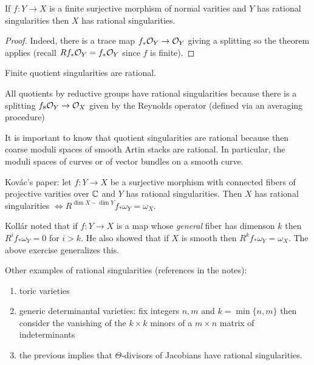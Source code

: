 \documentclass[12pt]{article}
\begin{document}
\begin{cor}
If $f : Y \to X$ is a finite surjective morphism of normal varities and $Y$ has rational singularities then $X$ has rational singularities.
\end{cor}

\begin{proof}
Indeed, there is a trace map $f_* \mathcal{O}_{Y} \to \mathcal{O}_{Y}$ giving a splitting so the theorem applies (recall $R f_* \mathcal{O}_{Y} = f_* \mathcal{O}_{Y}$ since $f$ is finite).
\end{proof}

\begin{cor}
Finite quotient singularities are rational. 
\end{cor}

\begin{example}
All quotients by reductive groups have rational singularities because there is a splitting $f_8 \mathcal{O}_{Y} \to \mathcal{O}_{X}$ given by the Reynolds operator (defined via an averaging procedure)
\end{example}

It is important to know that quotient singularities are rational because then coarse moduli spaces of smooth Artin stacks are rational. In particular, the moduli spaces of curves or of vector bundles on a smooth curve. 

\begin{exercise}
Kov\'{a}c's paper: let $f : Y \to X$ be a surjective morphism with connected fibers of projective varities over $\mathbb{C}$ and $Y$ has rational singularities. Then $X$ has rational singularities $\iff R^{\dim{X} - \dim{Y}} f_* \omega_Y = \omega_X$.
\end{exercise}

Koll\'{a}r noted that if $f : Y \to X$ is a map whose \textit{general} fiber has dimenson $k$ then $R^i f_* \omega_Y = 0$ for $i > k$. He also showed that if $X$ is smooth then $R^k f_* \omega_Y = \omega_X$. The above exercise generalizes this. 

\begin{exercise}
Other examples of rational singularities (references in the notes):
\begin{enumerate}
\item toric varieties
\item generic determinantal varieties: fix integers $n,m$ and $k = \min \{ n, m \}$ then consider the vanishing of the $k \times k$ minors of a $m \times n$ matrix of indeterminants
\item the previous implies that $\Theta$-divisors of Jacobians have rational singularities.
\end{enumerate}
\end{exercise}
\end{document}
